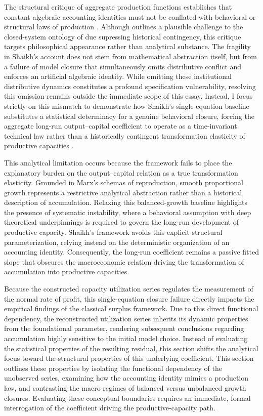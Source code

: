 \documentclass[11pt]{article}
\begin{document}
The structural critique of aggregate production functions establishes that constant algebraic accounting identities must not be conflated with behavioral or structural laws of production \citep{Shaikh1974}. Although \citet{Patomaki2017} outlines a plausible challenge to the closed-system ontology of \citet{Shaikh2016} due supressing historical contingency, this critique targets philosophical appearance rather than analytical substance. The fragility in Shaikh's account does not stem from mathematical abstraction itself, but from a failure of model closure that simultaneously omits distributive conflict and enforces an artificial algebraic identity. While omitting these institutional distributive dynamics constitutes a profound specification vulnerability, resolving this omission remains outside the immediate scope of this essay. Instead, I focus strictly on this  mismatch to demonstrate how Shaikh's single-equation baseline substitutes a statistical determinacy for a genuine behavioral closure, forcing the aggregate long-run output--capital coefficient to operate as a time-invariant technical law rather than a historically contingent transformation elasticity of productive capacities \citep{Nikiforos2021closure}.


This analytical limitation occurs because the framework fails to place the explanatory burden on the output--capital relation as a true transformation elasticity. Grounded in Marx's schemas of reproduction, smooth proportional growth represents a restrictive analytical abstraction rather than a historical description of accumulation. Relaxing this balanced-growth baseline highlights the presence of systematic instability, where a behavioral assumption with deep theoretical underpinnings is required to govern the long-run development of productive capacity. Shaikh's framework avoids this explicit structural parameterization, relying instead on the deterministic organization of an accounting identity. Consequently, the long-run coefficient remains a passive fitted slope that obscures the macroeconomic relation driving the transformation of accumulation into productive capacities.

Because the constructed capacity utilization series regulates the measurement of the normal rate of profit, this single-equation closure failure directly impacts the empirical findings of the classical surplus framework. Due to this direct functional dependency, the reconstructed utilization series inherits its dynamic properties from the foundational parameter, rendering subsequent conclusions regarding accumulation highly sensitive to the initial model choice. Instead of evaluating the statistical properties of the resulting residual, this section shifts the analytical focus toward the structural properties of this underlying coefficient. This section outlines these properties by isolating the functional dependency of the unobserved series, examining how the accounting identity mimics a production law, and contrasting the macro-regimes of balanced versus unbalanced growth closures. Evaluating these conceptual boundaries requires an immediate, formal interrogation of the coefficient driving the productive-capacity path.
\end{document}
